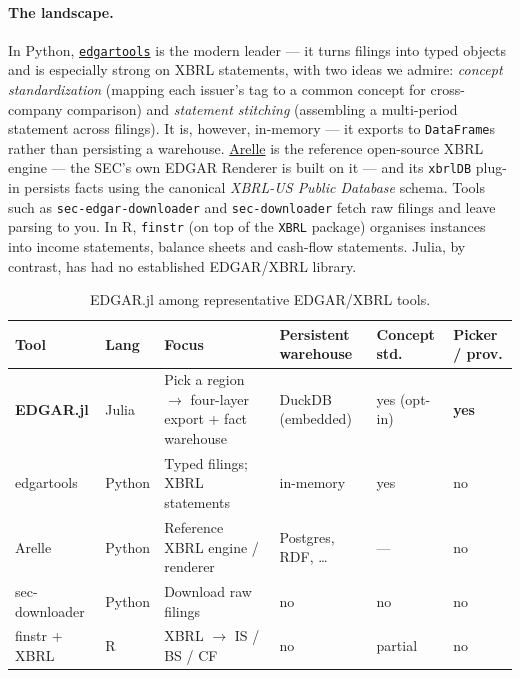 \documentclass[11pt,a4paper]{report}
\begin{document}
\paragraph{The landscape.} In Python, \href{https://github.com/dgunning/edgartools}{\texttt{edgartools}}
is the modern leader --- it turns filings into typed objects and is especially strong on XBRL
statements, with two ideas we admire: \emph{concept standardization} (mapping each issuer's tag
to a common concept for cross-company comparison) and \emph{statement stitching} (assembling a
multi-period statement across filings). It is, however, in-memory --- it exports to
\texttt{DataFrame}s rather than persisting a warehouse. \href{https://arelle.org/}{Arelle} is the
reference open-source XBRL engine --- the SEC's own EDGAR Renderer is built on it --- and its
\texttt{xbrlDB} plug-in persists facts using the canonical \emph{XBRL-US Public Database} schema.
Tools such as \texttt{sec-edgar-downloader} and \texttt{sec-downloader} fetch raw filings and
leave parsing to you. In R, \texttt{finstr} (on top of the \texttt{XBRL} package) organises
instances into income statements, balance sheets and cash-flow statements. Julia, by contrast,
has had no established EDGAR/XBRL library.

\begin{table}[h]
\centering
\caption{EDGAR.jl among representative EDGAR/XBRL tools.}
\label{tab:related-work}
\small
\begin{tabular}{@{}p{}p{}p{}p{}p{}p{}@{}}
\toprule
\textbf{Tool} & \textbf{Lang} & \textbf{Focus} & \textbf{Persistent warehouse} & \textbf{Concept std.} & \textbf{Picker / prov.} \\
\midrule
\textbf{EDGAR.jl} & Julia & Pick a region $\to$ four-layer export + fact warehouse & DuckDB (embedded) & yes (opt-in) & \textbf{yes} \\
edgartools & Python & Typed filings; XBRL statements & in-memory & yes & no \\
Arelle & Python & Reference XBRL engine / renderer & Postgres, RDF, \ldots & --- & no \\
sec-downloader & Python & Download raw filings & no & no & no \\
finstr + XBRL & R & XBRL $\to$ IS / BS / CF & no & partial & no \\
\bottomrule
\end{tabular}
\end{table}
\end{document}
